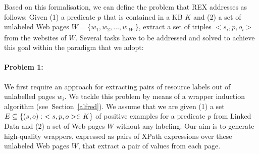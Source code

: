 Based on this formalisation, we can define the problem that REX addresses as follows: Given (1)
a predicate $p$ that is contained in a  \ac{KB} $K$ 
and (2) a set of unlabeled Web pages $W = \{w_1, w_2, \ldots, w_{|W|}\}$,
extract a set of triples $<s_i, p, o_i>$ from the websites of $W$.
Several tasks have to be addressed and solved to achieve this goal within the paradigm that we adopt: %


\paragraph{Problem 1:}
We first require an approach for extracting pairs of resource labels out of unlabelled pages $w_i$. 
We tackle this problem by means of a wrapper induction algorithm (see~Section~\ref{alfred}). 
We assume that we are given (1) a set ${\examples} \subseteq \{(s,o):\ <s,p,o> \in K\}$ of positive examples for a predicate $p$ from Linked Data and (2) a set of Web pages $W$ without any labeling. 
Our aim is to generate high-quality wrappers, expressed as pairs of XPath expressions over these unlabeled Web pages $W$, that extract a pair of values from each page.
